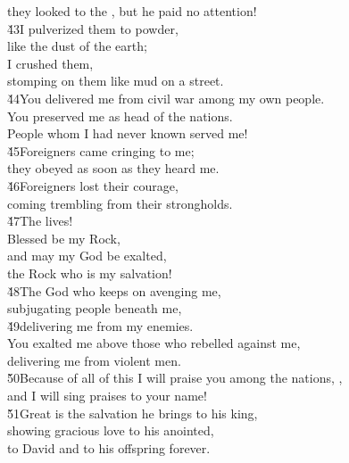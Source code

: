 \begin{poetry}
\poemll    they looked to the , but he paid no attention! \\
\poeml \v{43}I pulverized them to powder, \\
\poemll    like the dust of the earth; \\
\poeml I crushed them, \\
\poemll    stomping on them like mud on a street. \\
\poeml \v{44}You delivered me from civil war among my own people. \\
\poemll    You preserved me as head of the nations. \\
\poemlll       People whom I had never known served me! \\
\poeml \v{45}Foreigners came cringing to me; \\
\poemll    they obeyed as soon as they heard me. \\
\poeml \v{46}Foreigners lost their courage, \\
\poemll    coming trembling from their strongholds. \\
\poeml \v{47}The  lives! \\
\poemll    Blessed be my Rock, \\
\poeml and may my God be exalted, \\
\poemll    the Rock who is my salvation! \\
\poeml \v{48}The God who keeps on avenging me, \\
\poemll    subjugating people beneath me, \\
\poeml \v{49}delivering me from my enemies. \\
\poeml You exalted me above those who rebelled against me, \\
\poemll    delivering me from violent men. \\
\poeml \v{50}Because of all of this I will praise you among the nations, , \\
\poemll    and I will sing praises to your name! \\
\poeml \v{51}Great is the salvation he brings to his king, \\
\poemll    showing gracious love to his anointed, \\
\poemlll       to David and to his offspring forever.
\end{poetry}


